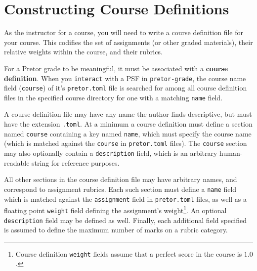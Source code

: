\documentclass{book}
\begin{document}
\section{Constructing Course Definitions} \label{sec:course_definitions}

As the instructor for a course, you will need to write a course definition file
for your course. This codifies the set of assignments (or other graded
materials), their relative weights within the course, and their rubrics.

For a Pretor grade to be meaningful, it must be associated with a
\textbf{course definition}. When you \texttt{interact} with a PSF in
\texttt{pretor-grade}, the course name field (\texttt{course}) of it's
\texttt{pretor.toml} file is searched for among all course definition files in
the specified course directory for one with a matching \texttt{name} field.


A course definition file may have any name the author finds descriptive, but
must have the extension \texttt{.toml}. At a minimum a course definition must
define a section named \texttt{course} containing a key named \texttt{name},
which must specify the course name (which is matched against the
\texttt{course} in \texttt{pretor.toml} files). The \texttt{course} section may
also optionally contain a \texttt{description} field, which is an arbitrary
human-readable string for reference purposes.

All other sections in the course definition file may have arbitrary names, and
correspond to assignment rubrics. Each such section must define a \texttt{name}
field which is matched against the \texttt{assignment} field in
\texttt{pretor.toml} files, as well as a floating point \texttt{weight} field
defining the assignment's weight\footnote{Course definition \texttt{weight}
fields assume that a perfect score in the course is $1.0$.}. An optional
\texttt{description} field may be defined as well. Finally, each additional
field specified is assumed to define the maximum number of marks on a rubric
category.

\end{document}
